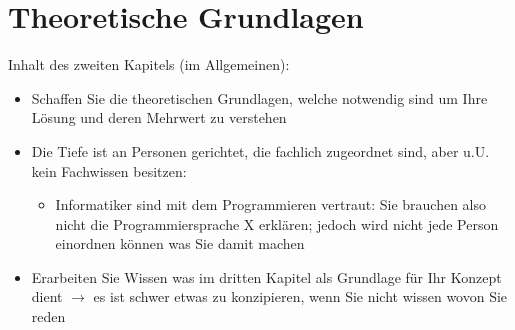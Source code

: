

\clearpage
\chapter{Theoretische Grundlagen}
Inhalt des zweiten Kapitels (im Allgemeinen):
\begin{itemize}
    \item Schaffen Sie die theoretischen Grundlagen, welche notwendig sind um Ihre Lösung und deren Mehrwert zu verstehen
    \item Die Tiefe ist an Personen gerichtet, die fachlich zugeordnet sind, aber u.U. kein Fachwissen besitzen:
    \begin{itemize}
        \item Informatiker sind mit dem Programmieren vertraut: Sie brauchen also nicht die Programmiersprache X erklären; jedoch wird nicht jede Person einordnen können was Sie damit machen
    \end{itemize}
    \item Erarbeiten Sie Wissen was im dritten Kapitel als Grundlage für Ihr Konzept dient $\rightarrow$ es ist schwer etwas zu konzipieren, wenn Sie nicht wissen wovon Sie reden
\end{itemize}
